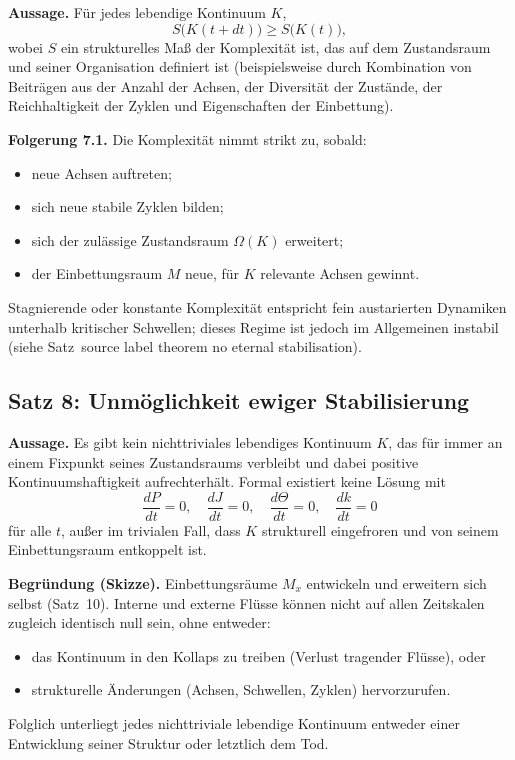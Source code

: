 \textbf{Aussage.}
Für jedes lebendige Kontinuum \(K\),
\[
    S\big(K(t+dt)\big) \ge S\big(K(t)\big),
\]
wobei \(S\) ein strukturelles Maß der Komplexität ist, das auf dem Zustandsraum und seiner Organisation definiert ist (beispielsweise durch Kombination von Beiträgen aus der Anzahl der Achsen, der Diversität der Zustände, der Reichhaltigkeit der Zyklen und Eigenschaften der Einbettung).

\textbf{Folgerung 7.1.}
Die Komplexität nimmt strikt zu, sobald:
\begin{itemize}
    \item neue Achsen auftreten;
    \item sich neue stabile Zyklen bilden;
    \item sich der zulässige Zustandsraum \(\Omega(K)\) erweitert;
    \item der Einbettungsraum \(M\) neue, für \(K\) relevante Achsen gewinnt.
\end{itemize}
Stagnierende oder konstante Komplexität entspricht fein austarierten Dynamiken unterhalb kritischer Schwellen; dieses Regime ist jedoch im Allgemeinen instabil (siehe Satz~source label theorem no eternal stabilisation).

\subsection{Satz 8: Unmöglichkeit ewiger Stabilisierung}
\label{thm:no-eternal-stabilisation}

\textbf{Aussage.}
Es gibt kein nichttriviales lebendiges Kontinuum \(K\), das für immer an einem Fixpunkt seines Zustandsraums verbleibt und dabei positive Kontinuumshaftigkeit aufrechterhält.
Formal existiert keine Lösung mit
\[
    \frac{dP}{dt} = 0, \quad \frac{dJ}{dt} = 0, \quad \frac{d\Theta}{dt} = 0, \quad \frac{dk}{dt} = 0
\]
für alle \(t\), außer im trivialen Fall, dass \(K\) strukturell eingefroren und von seinem Einbettungsraum entkoppelt ist.

\textbf{Begründung (Skizze).}
Einbettungsräume \(M_x\) entwickeln und erweitern sich selbst (Satz~10).
Interne und externe Flüsse können nicht auf allen Zeitskalen zugleich identisch null sein, ohne entweder:
\begin{itemize}
    \item das Kontinuum in den Kollaps zu treiben (Verlust tragender Flüsse), oder
    \item strukturelle Änderungen (Achsen, Schwellen, Zyklen) hervorzurufen.
\end{itemize}
Folglich unterliegt jedes nichttriviale lebendige Kontinuum entweder einer Entwicklung seiner Struktur oder letztlich dem Tod.

